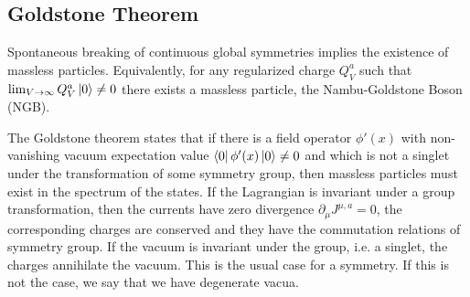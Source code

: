 \documentclass[../main.tex]{subfiles}
\begin{document}
\subsection{Goldstone Theorem}
\label{GT}
\begin{theorem}
Spontaneous breaking of continuous global symmetries implies the existence of massless particles. Equivalently, for any regularized charge $Q_V^a$ such that $\lim_{V\to\infty}Q_V^a\ket{0}\neq0$ there exists a massless particle, the Nambu-Goldstone Boson (NGB). 
\end{theorem}
The Goldstone theorem states that if there is a field operator $\phi'(x)$ with non-vanishing vacuum expectation value $\bra{0}\phi'(x)\ket{0}\neq0$ and which is not a singlet under the transformation of some symmetry group, then massless particles must exist in the spectrum of the states. If the Lagrangian is invariant under a group transformation, then the currents have zero divergence $\partial_\mu J^{\mu,a}=0$, the corresponding charges are conserved and they have the commutation relations of symmetry group. If the vacuum is invariant under the group, i.e. a singlet, the charges annihilate the vacuum. This is the usual case for a symmetry. If this is not the case, we say that we have degenerate vacua.
\end{document}
